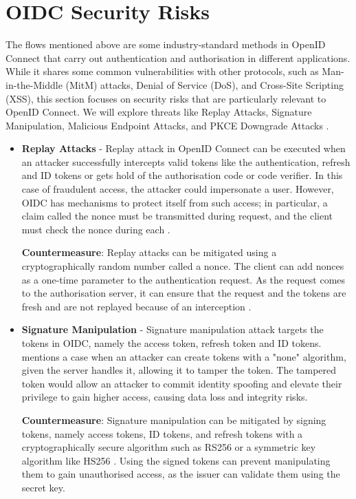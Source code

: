 \section{OIDC Security Risks}

The flows mentioned above are some industry-standard methods in OpenID Connect that carry out authentication and authorisation in different applications. While it shares some common vulnerabilities with other protocols, such as Man-in-the-Middle (MitM) attacks, Denial of Service (DoS), and Cross-Site Scripting (XSS), this section focuses on security risks that are particularly relevant to OpenID Connect. We will explore threats like Replay Attacks, Signature Manipulation, Malicious Endpoint Attacks, and PKCE Downgrade Attacks \citep{oidc_attacks}. 

\begin{itemize}
    \item \textbf{Replay Attacks} - Replay attack in OpenID Connect can be executed when an attacker successfully intercepts valid tokens like the authentication, refresh and ID tokens or gets hold of the authorisation code or code verifier. In this case of fraudulent access, the attacker could impersonate a user. However, OIDC has mechanisms to protect itself from such access; in particular, a claim called the nonce must be transmitted during request, and the client must check the nonce during each \citep{oidc_attacks}. \newline

    \textbf{Countermeasure}: Replay attacks can be mitigated using a cryptographically random number called a nonce. The client can add nonces as a one-time parameter to the authentication request. As the request comes to the authorisation server, it can ensure that the request and the tokens are fresh and are not replayed because of an interception \citep{oidc_attacks}.
    
    \item \textbf{Signature Manipulation} - Signature manipulation attack targets the tokens in OIDC, namely the access token, refresh token and ID tokens. \cite{oidc_attacks} mentions a case when an attacker can create tokens with a "none" algorithm, given the server handles it, allowing it to tamper the token. The tampered token would allow an attacker to commit identity spoofing and elevate their privilege to gain higher access, causing data loss and integrity risks.\newline

    \textbf{Countermeasure}: Signature manipulation can be mitigated by signing tokens, namely access tokens, ID tokens, and refresh tokens with a cryptographically 
    secure algorithm such as RS256 or a symmetric key algorithm like HS256 \citep{signed_token}. Using the signed tokens can prevent manipulating them to gain unauthorised access, as the issuer can validate them using the secret key.
    

\end{itemize}
